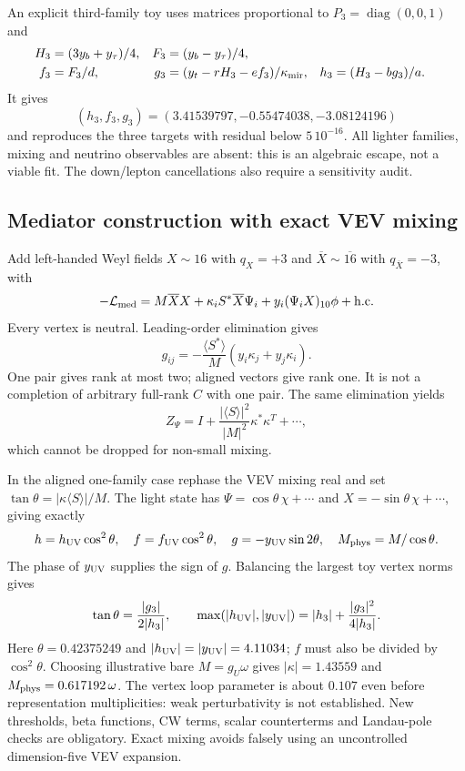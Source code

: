 \documentclass[11pt]{article}
\begin{document}
An explicit third-family toy uses matrices proportional to
$P_3=\operatorname{diag}(0,0,1)$ and
\begin{align}
H_3&=(3y_b+y_\tau)/4,&F_3&=(y_b-y_\tau)/4,\\
f_3&=F_3/d,&
g_3&=(y_t-rH_3-ef_3)/\kappa_{\rm mir},&
h_3&=(H_3-bg_3)/a .
\end{align}
It gives
\[
(h_3,f_3,g_3)=(3.41539797,-0.55474038,-3.08124196)
\]
and reproduces the three targets with residual below $5\,10^{-16}$.
All lighter families, mixing and neutrino observables are absent:
this is an algebraic escape, not a viable fit.
The down/lepton cancellations also require a sensitivity audit.

\subsection{Mediator construction with exact VEV mixing}
Add left-handed Weyl fields
$X\sim16$ with $q_X=+3$ and
$\overline X\sim\overline{16}$ with $q_{\overline X}=-3$, with
\begin{equation}
-\mathcal L_{\rm med}=M\overline XX+
\kappa_iS^*\overline X\Psi_i+
y_i(\Psi_iX)_{10}\phi+\mathrm{h.c.}
\end{equation}
Every vertex is neutral. Leading-order elimination gives
\[
g_{ij}=-\frac{\langle S^*\rangle}{M}
(y_i\kappa_j+y_j\kappa_i).
\]
One pair gives rank at most two; aligned vectors give rank one.
It is not a completion of arbitrary full-rank $C$ with one pair.
The same elimination yields
\[
Z_\Psi=I+\frac{|\langle S\rangle|^2}{|M|^2}\kappa^*\kappa^T+\cdots,
\]
which cannot be dropped for non-small mixing.

In the aligned one-family case rephase the VEV mixing real and set
$\tan\theta=|\kappa\langle S\rangle|/M$.
The light state has $\Psi=\cos\theta\,\chi+\cdots$ and
$X=-\sin\theta\,\chi+\cdots$, giving exactly
\begin{equation}
h=h_{\rm UV}\cos^2\theta,\quad f=f_{\rm UV}\cos^2\theta,\quad
g=-y_{\rm UV}\sin2\theta,\quad M_{\rm phys}=M/\cos\theta .
\label{eq:mix}
\end{equation}
The phase of $y_{\rm UV}$ supplies the sign of $g$.
Balancing the largest toy vertex norms gives
\[
\tan\theta=\frac{|g_3|}{2|h_3|},\qquad
\max(|h_{\rm UV}|,|y_{\rm UV}|)
=|h_3|+\frac{|g_3|^2}{4|h_3|}.
\]
Here $\theta=0.42375249$ and
$|h_{\rm UV}|=|y_{\rm UV}|=4.11034$; $f$ must also be divided
by $\cos^2\theta$. Choosing illustrative bare $M=g_U\omega$ gives
$|\kappa|=1.43559$ and $M_{\rm phys}=0.617192\,\omega$.
The vertex loop parameter is about $0.107$ even before representation
multiplicities: weak perturbativity is not established.
New thresholds, beta functions, CW terms, scalar counterterms and
Landau-pole checks are obligatory. Exact mixing avoids falsely using
an uncontrolled dimension-five VEV expansion.
\end{document}
